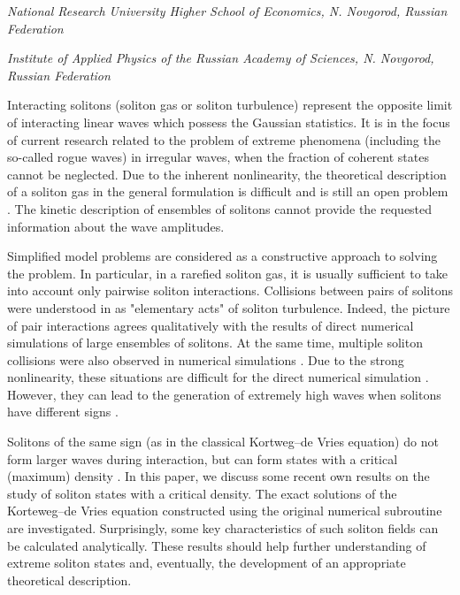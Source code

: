 
	
\begin{center}
	\maketitle
	{\large\textit{National Research University Higher School of Economics, N. Novgorod, Russian Federation}}
	
	{\large\textit{Institute of Applied Physics of the Russian Academy of Sciences, N. Novgorod, Russian Federation}}
\end{center}

Interacting solitons (soliton gas or soliton turbulence) represent the opposite limit of interacting linear waves which possess the Gaussian statistics. It is in the focus of current research related to the problem of extreme phenomena (including the so-called rogue waves) in irregular waves, when the fraction of coherent states cannot be neglected. Due to the inherent nonlinearity, the theoretical description of a soliton gas in the general formulation is difficult and is still an open problem \cite{PelinovskyShurgalina2017}. The kinetic description of ensembles of solitons cannot provide the requested information about the wave amplitudes.

Simplified model problems are considered as a constructive approach to solving the problem. In particular, in a rarefied soliton gas, it is usually sufficient to take into account only pairwise soliton interactions. Collisions between pairs of solitons were understood in \cite{Pelinovskyetal2013} as "elementary acts" of soliton turbulence. Indeed, the picture of pair interactions agrees qualitatively with the results of direct numerical simulations of large ensembles of solitons.
%
At the same time, multiple soliton collisions were also observed in numerical simulations \cite{GelashAgafontsev2018,Didenculova2019}. Due to the strong nonlinearity, these situations are difficult for the direct numerical simulation \cite{Didenkulovaetal2019}. However, they can lead to the generation of extremely high waves when solitons have different signs \cite{SlunyaevPelinovsky2016,Slunyaev2019}.

Solitons of the same sign (as in the classical Kortweg--de Vries equation) do not form larger waves during interaction, but can form states with a critical (maximum) density \cite{PelinovskyShurgalina2017,El2016}. In this paper, we discuss some recent own results on the study of soliton states with a critical density. The exact solutions of the Korteweg--de Vries equation constructed using the original numerical subroutine are investigated. Surprisingly, some key characteristics of such soliton fields can be calculated analytically. These results should help further understanding of extreme soliton states and, eventually, the development of an appropriate theoretical description.

